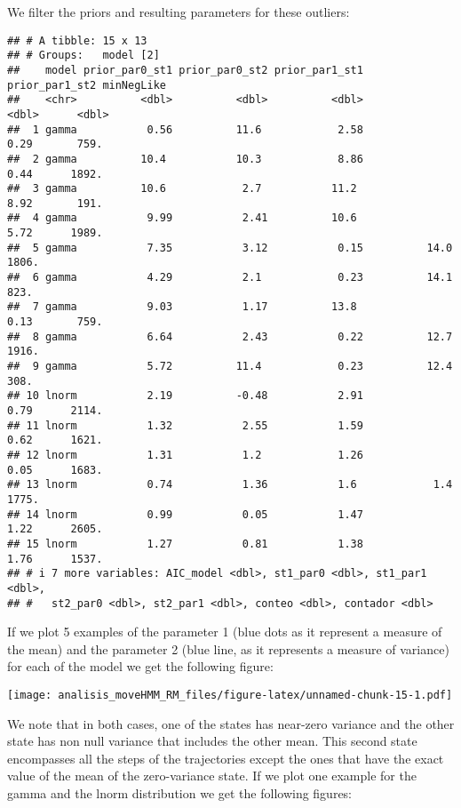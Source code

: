 \documentclass[
]{article}
\begin{document}
We filter the priors and resulting parameters for these outliers:

\begin{verbatim}
## # A tibble: 15 x 13
## # Groups:   model [2]
##    model prior_par0_st1 prior_par0_st2 prior_par1_st1 prior_par1_st2 minNegLike
##    <chr>          <dbl>          <dbl>          <dbl>          <dbl>      <dbl>
##  1 gamma           0.56          11.6            2.58           0.29       759.
##  2 gamma          10.4           10.3            8.86           0.44      1892.
##  3 gamma          10.6            2.7           11.2            8.92       191.
##  4 gamma           9.99           2.41          10.6            5.72      1989.
##  5 gamma           7.35           3.12           0.15          14.0       1806.
##  6 gamma           4.29           2.1            0.23          14.1        823.
##  7 gamma           9.03           1.17          13.8            0.13       759.
##  8 gamma           6.64           2.43           0.22          12.7       1916.
##  9 gamma           5.72          11.4            0.23          12.4        308.
## 10 lnorm           2.19          -0.48           2.91           0.79      2114.
## 11 lnorm           1.32           2.55           1.59           0.62      1621.
## 12 lnorm           1.31           1.2            1.26           0.05      1683.
## 13 lnorm           0.74           1.36           1.6            1.4       1775.
## 14 lnorm           0.99           0.05           1.47           1.22      2605.
## 15 lnorm           1.27           0.81           1.38           1.76      1537.
## # i 7 more variables: AIC_model <dbl>, st1_par0 <dbl>, st1_par1 <dbl>,
## #   st2_par0 <dbl>, st2_par1 <dbl>, conteo <dbl>, contador <dbl>
\end{verbatim}

If we plot 5 examples of the parameter 1 (blue dots as it represent a
measure of the mean) and the parameter 2 (blue line, as it represents a
measure of variance) for each of the model we get the following figure:

\texttt{[image: analisis\_moveHMM\_RM\_files/figure-latex/unnamed-chunk-15-1.pdf]}

We note that in both cases, one of the states has near-zero variance and
the other state has non null variance that includes the other mean. This
second state encompasses all the steps of the trajectories except the
ones that have the exact value of the mean of the zero-variance state.
If we plot one example for the gamma and the lnorm distribution we get
the following figures:
\end{document}
